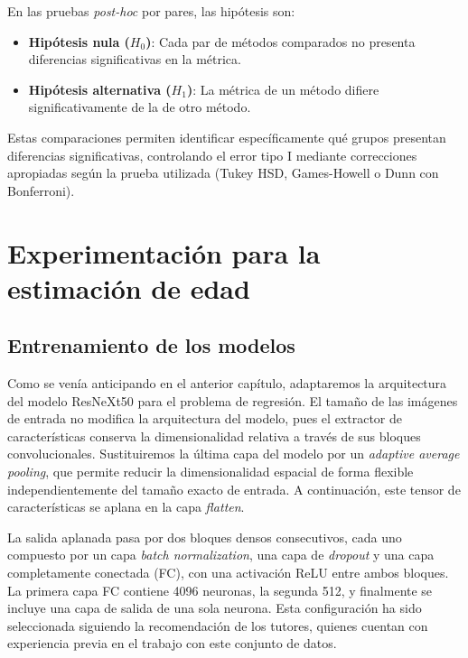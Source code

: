 En las pruebas \textit{post-hoc} por pares, las hipótesis son:

\begin{itemize}
    \item \textbf{Hipótesis nula ($H_0$)}: Cada par de métodos comparados no presenta diferencias significativas en la métrica.
    \item \textbf{Hipótesis alternativa ($H_1$)}: La métrica de un método difiere significativamente de la de otro método.
\end{itemize}

Estas comparaciones permiten identificar específicamente qué grupos presentan diferencias significativas, controlando el error tipo I mediante correcciones apropiadas según la prueba utilizada (Tukey HSD, Games-Howell o Dunn con Bonferroni).


\section{Experimentación para la estimación de edad}


\subsection{Entrenamiento de los modelos}

Como se venía anticipando en el anterior capítulo, adaptaremos la arquitectura del modelo ResNeXt50 para el problema de regresión. El tamaño de las imágenes de entrada no modifica la arquitectura del modelo, pues el extractor de características conserva la dimensionalidad relativa a través de sus bloques convolucionales. Sustituiremos la última capa del modelo por un \textit{adaptive average pooling}, que permite reducir la dimensionalidad espacial de forma flexible independientemente del tamaño exacto de entrada. A continuación, este tensor de características se aplana en la capa \textit{flatten}.

La salida aplanada pasa por dos bloques densos consecutivos, cada uno compuesto por un capa \textit{batch normalization}, una capa de \textit{dropout} y una capa completamente conectada (FC), con una activación ReLU entre ambos bloques. La primera capa FC contiene 4096 neuronas, la segunda 512, y finalmente se incluye una capa de salida de una sola neurona. Esta configuración ha sido seleccionada siguiendo la recomendación de los tutores, quienes cuentan con experiencia previa en el trabajo con este conjunto de datos.

